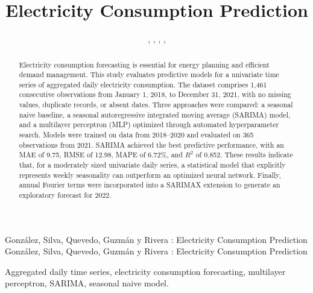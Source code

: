 \documentclass{ieeeaccess}
\begin{document}
\title{Electricity Consumption Prediction}
\author{
    , 
    , 
    , 
    , 
     \\
}

\markboth
{González, Silva, Quevedo, Guzmán y Rivera \headeretal: Electricity Consumption Prediction}
{González, Silva, Quevedo, Guzmán y Rivera \headeretal: Electricity Consumption Prediction}



\begin{abstract}
Electricity consumption forecasting is essential for energy planning and efficient demand management. This study evaluates predictive models for a univariate time series of aggregated daily electricity consumption. The dataset comprises 1,461 consecutive observations from January 1, 2018, to December 31, 2021, with no missing values, duplicate records, or absent dates. Three approaches were compared: a seasonal naive baseline, a seasonal autoregressive integrated moving average (SARIMA) model, and a multilayer perceptron (MLP) optimized through automated hyperparameter search. Models were trained on data from 2018--2020 and evaluated on 365 observations from 2021. SARIMA achieved the best predictive performance, with an MAE of 9.75, RMSE of 12.98, MAPE of 6.72\%, and $R^2$ of 0.852. These results indicate that, for a moderately sized univariate daily series, a statistical model that explicitly represents weekly seasonality can outperform an optimized neural network. Finally, annual Fourier terms were incorporated into a SARIMAX extension to generate an exploratory forecast for 2022.
\end{abstract}

\begin{IEEEkeywords}
Aggregated daily time series, electricity consumption forecasting, multilayer perceptron, SARIMA, seasonal naive model.
\end{IEEEkeywords}

\titlepgskip=-15pt
\doi{}
\maketitle
\end{document}
